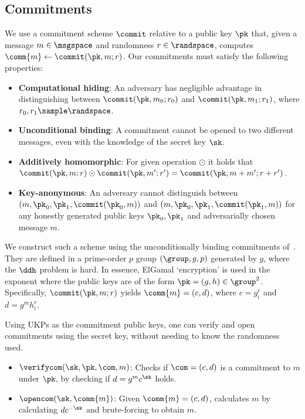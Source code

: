 \subsection{Commitments}
We use a commitment scheme $\commit$ relative to a public key $\pk$ that, given a message $m \in \msgspace$ and randomness $r \in \randspace$,
computes $\comm{m} \gets \commit(\pk, m;r)$. 
Our commitments must satisfy the following properties: 
\begin{itemize}
    \item \textbf{Computational hiding}: An adversary has negligible advantage in distinguishing between $\commit(\pk, m_0;r_0)$ 
    and $\commit(\pk, m_1;r_1)$, where $r_0, r_1 \sample \randspace$.
    \item \textbf{Unconditional binding}: A commitment cannot be opened to two different messages, even with the knowledge of the secret key $\sk$.
    \item \textbf{Additively homomorphic}: For given operation $\odot$ it holds that \\
     $\commit(\pk, m;r) \odot \commit(\pk, m';r') = \commit(\pk, m+m';r+r')$.
    \item \textbf{Key-anonymous}: An adversary cannot distinguish between \\
     $(m, \pk_0, \pk_1, \commit(\pk_0, m))$ and $(m, \pk_0, \pk_1, \commit(\pk_1, m))$ for any honestly generated public keys $\pk_0, \pk_1$ and adversarially chosen message $m$.
\end{itemize}

We construct such a scheme using the unconditionally binding commitments of~\cite{fauzi2019quisquis}. They are defined in a prime-order $p$ group $(\group, g, p)$ generated by $g$, where the $\ddh$ problem is hard.
In essence, ElGamal `encryption' is used in the exponent where the public keys are of the form $\pk = (g, h) \in \group^2$. 
Specifically,  
 $\commit(\pk, m; r)$ yields $\comm{m} = (c, d)$, where $c = g_i^r$ and $d = g^m h_i^r$.

 Using UKPs as the commitment public keys, one can verify and open commitments using the secret key, without needing to know the randomness used.
\begin{itemize}
    \item $\verifycom(\sk, \pk, \com, m)$: Checks if $\com = (c,d)$ is a commitment to $m$ under $\pk$, by checking if $ d = g^m c^\sk $ holds.
    \item $\opencom(\sk, \comm{m})$: Given $\comm{m} = (c, d)$, calculates $m$ by calculating $dc^{-\sk}$ and brute-forcing to obtain $m$.
\end{itemize}